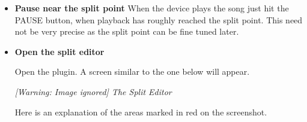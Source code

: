 \begin{itemize}
\item \textbf{Pause near the split point}
When the device plays the song just hit the PAUSE button, when playback
has roughly reached the split point. This need not be very precise as
the split point can be fine tuned later.
\item \textbf{Open the split editor}

Open the plugin.  A screen similar to the one below will appear. 

{\centering\itshape
  [Warning: Image ignored] %
 \newline
The Split Editor
\par}

{\centering\upshape
Here is an explanation of the areas marked in red on the screenshot.
\par}


\end{itemize}
